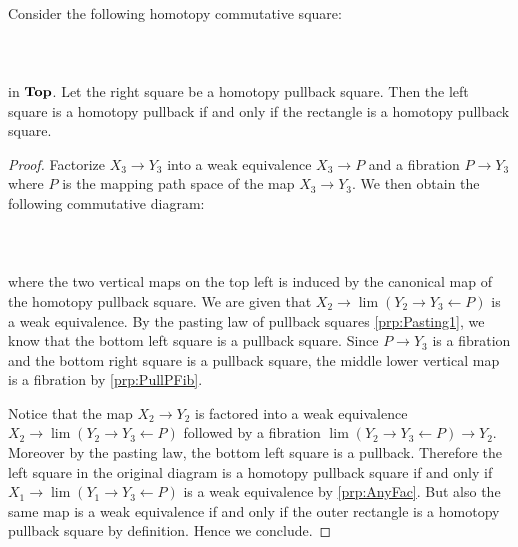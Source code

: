\documentclass[a4paper]{article}
\begin{document}
\begin{prp}{}{}\\
Consider the following homotopy commutative square:  
 \\~\\  \\~\\
in $\bold{Top}$. Let the right square be a homotopy pullback square. Then the left square is a homotopy pullback if and only if the rectangle is a homotopy pullback square. 
\begin{proof}
Factorize $X_3\to Y_3$ into a weak equivalence $X_3\to P$ and a fibration $P\to Y_3$ where $P$ is the mapping path space of the map $X_3\to Y_3$. We then obtain the following commutative diagram:  
 \\~\\  \\~\\
where the two vertical maps on the top left is induced by the canonical map of the homotopy pullback square. We are given that $X_2\to\lim(Y_2\rightarrow Y_3\leftarrow P)$ is a weak equivalence. By the pasting law of pullback squares \ref{prp:Pasting1}, we know that the bottom left square is a pullback square. Since $P\to Y_3$ is a fibration and the bottom right square is a pullback square, the middle lower vertical map is a fibration by \ref{prp:PullPFib}. 

Notice that the map $X_2\to Y_2$ is factored into a weak equivalence $X_2\to\lim(Y_2\rightarrow Y_3\leftarrow P)$ followed by a fibration $\lim(Y_2\rightarrow Y_3\leftarrow P)\to Y_2$. Moreover by the pasting law, the bottom left square is a pullback. Therefore the left square in the original diagram is a homotopy pullback square if and only if $X_1\to\lim(Y_1\rightarrow Y_3\leftarrow P)$ is a weak equivalence by \ref{prp:AnyFac}. But also the same map is a weak equivalence if and only if the outer rectangle is a homotopy pullback square by definition. Hence we conclude.
\end{proof}
\end{prp}
\end{document}
